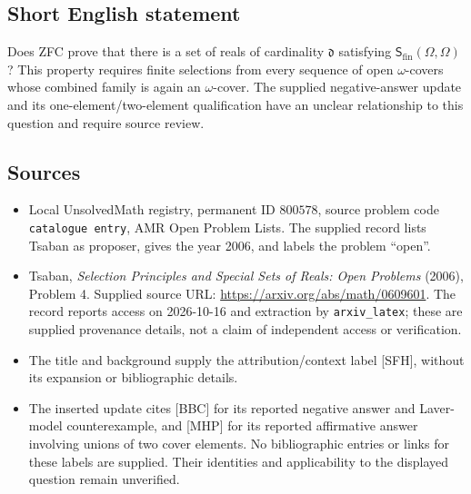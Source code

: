 \documentclass[11pt]{article}
\begin{document}
\subsection{Short English statement}
Does ZFC prove that there is a set of reals of cardinality \(\mathfrak d\) satisfying \(\mathsf S_{\mathrm{fin}}(\Omega,\Omega)\)? This property requires finite selections from every sequence of open \(\omega\)-covers whose combined family is again an \(\omega\)-cover. The supplied negative-answer update and its one-element/two-element qualification have an unclear relationship to this question and require source review.
\subsection{Sources}
\begin{itemize}
\item Local UnsolvedMath registry, permanent ID \(800578\), source problem code \texttt{catalogue entry}, AMR Open Problem Lists. The supplied record lists Tsaban as proposer, gives the year 2006, and labels the problem ``open''.
\item Tsaban, \emph{Selection Principles and Special Sets of Reals: Open Problems} (2006), Problem 4. Supplied source URL: \url{https://arxiv.org/abs/math/0609601}. The record reports access on 2026-10-16 and extraction by \texttt{arxiv\_latex}; these are supplied provenance details, not a claim of independent access or verification.
\item The title and background supply the attribution/context label [SFH], without its expansion or bibliographic details.
\item The inserted update cites [BBC] for its reported negative answer and Laver-model counterexample, and [MHP] for its reported affirmative answer involving unions of two cover elements. No bibliographic entries or links for these labels are supplied. Their identities and applicability to the displayed question remain unverified.
\end{itemize}
\end{document}
